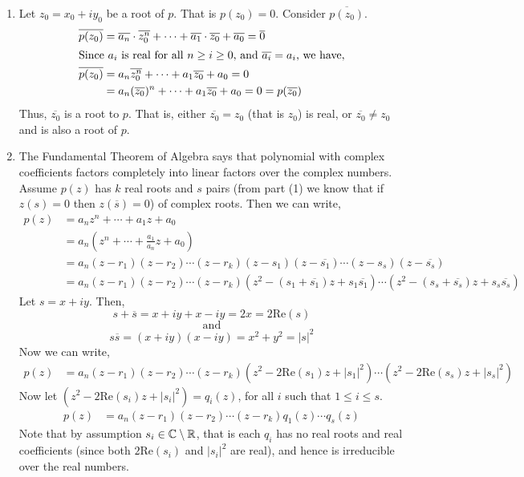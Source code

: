\documentclass[12pt]{article}
\begin{document}
\begin{solution}
    \bbni
    \begin{enumerate}
        \item Let $z_0 = x_0 + iy_0$ be a root of $p$. That is $p(z_0) = 0$. Consider $\overline{p(z_0)}$. 
        \begin{align*}
            \overline{p(z_0)} &= \overline{a_n}  \cdot \overline{z_0^n} + \cdots + \overline{a_1} \cdot \overline{z_0} + \overline{a_0} = \overline{0} \\ 
        \intertext{Since $a_i$ is real for all $n \geq i \geq 0$, and $\overline{a_i} = a_i$, we have,}
            \overline{p(z_0)} &= a_n \overline{z_0^n} + \cdots + a_1 \overline{z_0} + a_0 = 0 \\ 
            &= a_n (\overline{z_0})^n + \cdots + a_1 \overline{z_0} + a_0 = 0 = p(\overline{z_0})
        \end{align*}
        Thus, $\overline{z_0}$ is a root to $p$. That is, either $\overline{z_0} = z_0$ (that is $z_0$) is real, or $\overline{z_0} \neq z_0$ and is also a root of $p$. 

        \item The Fundamental Theorem of Algebra says that polynomial with complex coefficients factors completely into linear factors over the complex numbers. Assume $p(z)$ has $k$ real roots and $s$ pairs (from part (1) we know that if $z(s) = 0$ then $z(\overline{s}) = 0$) of complex roots. Then we can write, 
        \begin{align*}
            p(z) &=  a_nz^n + \cdots + a_1z + a_0 \\
            &=  a_n\left(z^n + \cdots + \frac{a_1}{a_n}z + a_0 \right) \\ 
            &= a_n(z - r_1)(z-r_2)\cdots(z-r_k)(z - s_1)(z - \overline{s_1})\cdots(z - s_s)(z- \overline{s_s}) \\
            &= a_n(z - r_1)(z-r_2)\cdots(z-r_k)(z^2 - (s_1+\overline{s_1})z + s_1\overline{s_1}) \cdots (z^2 - (s_s+\overline{s_s})z + s_s\overline{s_s})
        \end{align*}
        {Let $s = x + iy$. Then, 
        \[s + \overline s = x + iy + x - iy = 2 x = 2 \text{Re}(s)\] \[\text{ and }\] \[s\overline s = (x+iy)(x-iy) = x^2 + y^2 = |s|^2 \]}
        Now we can write, 
        \begin{align*}
            p(z) 
            &= a_n(z - r_1)(z-r_2)\cdots(z-r_k)(z^2 - 2\text{Re}(s_1)z + |s_1|^2)\cdots (z^2 - 2\text{Re}(s_s)z  + |s_s|^2)
        \end{align*}
        Now let $(z^2 - 2\text{Re}(s_i)z + |s_i|^2) = q_i(z)$, for all $i$ such that $1 \leq i \leq s$.
        \begin{align*}
            p(z)&= a_n(z - r_1)(z-r_2)\cdots(z-r_k)q_1(z) \cdots q_s(z)
        \end{align*}
        Note that by assumption $s_i \in \mathbb C \setminus \mathbb R$, that is each $q_i$ has no real roots and real coefficients (since both $2$Re$(s_i)$ and $|s_i|^2$ are real), and hence is irreducible over the real numbers.


\end{enumerate}
\end{solution}
\end{document}

